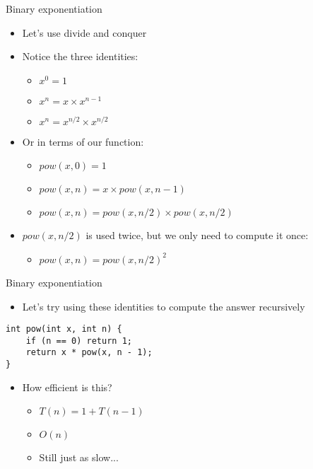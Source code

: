 \documentclass[12pt,t]{beamer}
\newcommand{\bi}{\begin{itemize}}
\newcommand{\ei}{\end{itemize}}
\begin{document}
\begin{frame}{Binary exponentiation}
    \bi
        \item Let's use divide and conquer
        \vspace{10pt}
        \item Notice the three identities:

            \bi
                \item $x^0 = 1$
                \item $x^n = x \times x^{n-1}$
                \item $x^n = x^{n/2} \times x^{n/2}$
            \ei

        \item Or in terms of our function:

            \bi
                \item $pow(x,0) = 1$
                \item $pow(x,n) = x \times pow(x, n-1)$
                \item $pow(x,n) = pow(x, n/2) \times pow(x, n/2)$
            \ei

        \item $pow(x,n/2)$ is used twice, but we only need to compute it once:

            \bi
                \item $pow(x,n) = pow(x, n/2)^2$
            \ei
    \ei
\end{frame}

\begin{frame}[fragile]{Binary exponentiation}
    \vspace{20pt}

    \bi
        \item Let's try using these identities to compute the answer recursively
    \ei

    \vspace{10pt}

    \begin{verbatim}
int pow(int x, int n) {
    if (n == 0) return 1;
    return x * pow(x, n - 1);
}
    \end{verbatim}

    \vspace{10pt}

    \bi
        \item<2-> How efficient is this?
            \bi
                \item $T(n) = 1 + T(n-1)$
                \item<3-> $O(n)$
                \item<4-> Still just as slow...
            \ei
    \ei

\end{frame}
\end{document}
